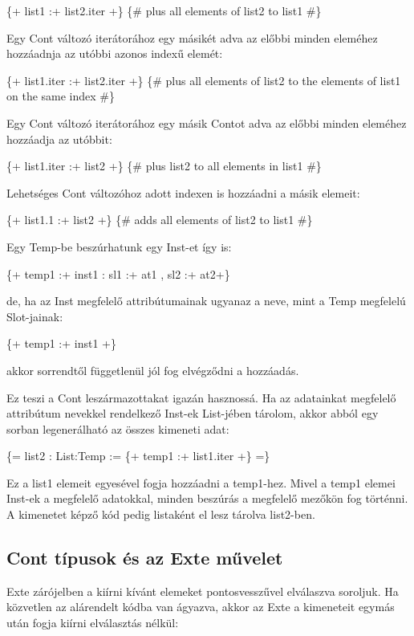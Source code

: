 {\{+ list1 :+ list2.iter +\} \{\# plus all elements of list2 to list1 \#\}

Egy Cont változó iterátorához egy másikét adva az előbbi minden eleméhez hozzáadnja az utóbbi azonos indexű elemét:

\{+ list1.iter :+ list2.iter +\} \{\# plus all elements of list2 to the elements of list1 on the same index \#\}

Egy Cont változó iterátorához egy másik Contot adva az előbbi minden eleméhez hozzáadja az utóbbit:

\{+ list1.iter :+ list2 +\} \{\# plus list2 to all elements in list1 \#\}

Lehetséges Cont változóhoz adott indexen is hozzáadni a másik elemeit:

\{+ list1.1 :+ list2 +\} \{\# adds all elements of list2 to list1 \#\}

Egy Temp-be beszúrhatunk egy Inst-et így is:

\{+ temp1 :+ inst1 : sl1 :+ at1 , sl2 :+ at2+\}

de, ha az Inst megfelelő attribútumainak ugyanaz a neve, mint a Temp megfelelú Slot-jainak:

\{+ temp1 :+ inst1 +\}

akkor sorrendtől függetlenül jól fog elvégződni a hozzáadás.

Ez teszi a Cont leszármazottakat igazán hasznossá.
Ha az adatainkat megfelelő attribútum nevekkel rendelkező Inst-ek List-jében tárolom,
akkor abból egy sorban legenerálható az összes kimeneti adat:

\{= list2 : List:Temp := \{+ temp1 :+ list1.iter +\} =\}

Ez a list1 elemeit egyesével fogja hozzáadni a temp1-hez.
Mivel a temp1 elemei Inst-ek a megfelelő adatokkal, minden beszúrás a megfelelő mezőkön fog történni.
A kimenetet képző kód pedig listaként el lesz tárolva list2-ben.



\subsection{Cont típusok és az Exte művelet}
Exte zárójelben a kiírni kívánt elemeket pontosvesszűvel elválaszva soroljuk.
Ha közvetlen az alárendelt kódba van ágyazva, akkor az Exte a kimeneteit egymás után fogja kiírni elválasztás nélkül:

}
